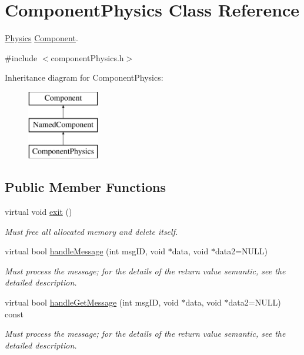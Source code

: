 \hypertarget{classComponentPhysics}{
\section{\-Component\-Physics \-Class \-Reference}
\label{d5/d44/classComponentPhysics}
}


\hyperlink{classPhysics}{\-Physics} \hyperlink{classComponent}{\-Component}.  




{\ttfamily \#include $<$component\-Physics.\-h$>$}

\-Inheritance diagram for \-Component\-Physics\-:\begin{figure}[H]
\begin{center}
\leavevmode
\includegraphics[height=3.000000cm]{d5/d44/classComponentPhysics}
\end{center}
\end{figure}
\subsection*{\-Public \-Member \-Functions}
\begin{DoxyCompactItemize}
\item 
\hypertarget{classComponentPhysics_a2beb27e9cfc3bdc040dc1d0ecee2f901}{
virtual void \hyperlink{classComponentPhysics_a2beb27e9cfc3bdc040dc1d0ecee2f901}{exit} ()}
\label{d5/d44/classComponentPhysics_a2beb27e9cfc3bdc040dc1d0ecee2f901}

\begin{DoxyCompactList}\small\item\em \-Must free all allocated memory and delete itself. \end{DoxyCompactList}\item 
virtual bool \hyperlink{classComponentPhysics_ac2ef9e611328dc2e2cbf772384426c28}{handle\-Message} (int msg\-I\-D, void $\ast$data, void $\ast$data2=\-N\-U\-L\-L)
\begin{DoxyCompactList}\small\item\em \-Must process the message; for the details of the return value semantic, see the detailed description. \end{DoxyCompactList}\item 
virtual bool \hyperlink{classComponentPhysics_a0979ce28418cf3ef7387e2bbb68c5411}{handle\-Get\-Message} (int msg\-I\-D, void $\ast$data, void $\ast$data2=\-N\-U\-L\-L) const 
\begin{DoxyCompactList}\small\item\em \-Must process the message; for the details of the return value semantic, see the detailed description. \end{DoxyCompactList}\end{DoxyCompactItemize}
